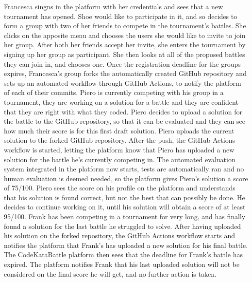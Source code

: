 \documentclass{article}
\newcounter{subsubsubsection}[subsubsection]
\begin{document}
{            
                Francesca singns in the platform with her credentials and sees that a new tournament has opened. Shoe would like to participate in it, and so decides to form a group with two of her friends to compete in the tournament's battles. She clicks on the apposite menu and chooses the users she would like to invite to join her group.
                After both her friends accept her invite, she enters the tournament by signing up her group as participant. She then looks at all of the proposed battles they can join in, and chooses one.
                Once the registration deadline for the groups expires, Francesca's group forks the automatically created GitHub repository and sets up an automated workflow through GitHub Actions, to notify the platform of each of their commits.
                Piero is currently competing with his group in a tournament, they are working on a solution for a battle and they are confident that they are right with what they coded. Piero decides to upload a solution for the battle to the GitHub repository, so that it can be evaluated and they can see how much their score is for this first draft solution.
                Piero uploads the current solution to the forked GitHub repository. After the push, the GitHub Actions workflow is started, letting the platform know that Piero has uploaded a new solution for the battle he's currently competing in.
                The automated evaluation system integrated in the platform now starts, tests are automatically ran and no human evaluation is deemed needed, so the platform gives Piero's solution a score of 75/100.
                Piero sees the score on his profile on the platform and understands that his solution is found correct, but not the best that can possibly be done. He decides to continue working on it, until his solution will obtain a score of at least 95/100.
                Frank has been competing in a tournament for very long, and has finally found a solution for the last battle he struggled to solve. After having uploaded his solution on the forked repository, the GitHub Actions workflow starts and notifies the platform that Frank's has uploaded a new solution for his final battle.
                The CodeKataBattle platform then sees that the deadline for Frank's battle has expired. The platform notifies Frank that his last uploaded solution will not be considered on the final score he will get, and no further action is taken.
}
\end{document}
